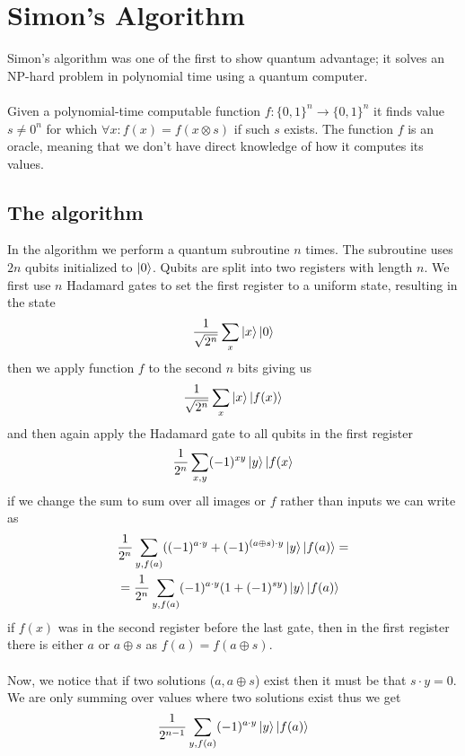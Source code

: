 \section{Simon's Algorithm}
Simon's algorithm was one of the first to show quantum advantage; it solves an NP-hard problem in polynomial time using a quantum computer. \\\\
Given a polynomial-time computable function $f:\{0,1\}^n \to \{0,1\}^n$ it finds value $s\neq0^n$ for which $\forall x:f(x)=f(x\otimes s)$ if such $s$ exists. The function $f$ is an oracle, meaning that we don't have direct knowledge of how it computes its values.
\subsection{The algorithm}
In the algorithm we perform a quantum subroutine $n$ times. The subroutine uses $2n$ qubits initialized to $\ket{0}$. Qubits are split into two registers with length $n$. We first use $n$ Hadamard gates to set the first register to a uniform state, resulting in the state
\begin{align*}
    \frac{1}{\sqrt{2^n}}\sum_x \ket{x}\ket{0}
\end{align*}
then we apply function $f$ to the second $n$ bits giving us
\begin{align*}
    \frac{1}{\sqrt{2^n}}\sum_x \ket{x}\ket{f(x)}
\end{align*}
and then again apply the Hadamard gate to all qubits in the first register
\begin{align*}
    \frac{1}{2^n}\sum_{x,y} (-1)^{xy}\ket{y}\ket{f(x}
\end{align*}
if we change the sum to sum over all images or $f$ rather than inputs we can write as
\begin{align*}
    &\frac{1}{2^n}\sum_{y,f(a)}((-1)^{a\cdot y}+(-1)^{(a\oplus s)\cdot y}\ket{y}\ket{f(a)}=\\
    &=\frac{1}{2^n}\sum_{y,f(a)}(-1)^{a\cdot y}(1+(-1)^{sy})\ket{y}\ket{f(a)}
\end{align*}
if $f(x)$ was in the second register before the last gate, then in the first register there is either $a$ or $a\oplus s$ as $f(a)=f(a\oplus s)$.\\\\
Now, we notice that if two solutions ($a, a\oplus s$) exist then it must be that $s \cdot y=0$. We are only summing over values where two solutions exist thus we get
\begin{align*}
    \frac{1}{2^{n-1}}\sum_{y,f(a)}(-1)^{a\cdot y}\ket{y}\ket{f(a)}
\end{align*}
